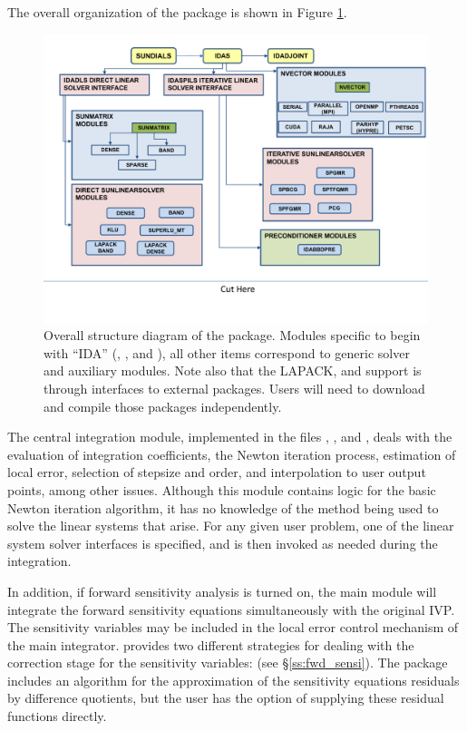 The overall organization of the {\idas} package is shown in Figure
\ref{f:idasorg}.
\begin{figure}
{\centerline{\includegraphics[width=\textwidth]{idasorg}}}
\caption [Overall structure diagram of the {\ida} package]
{Overall structure diagram of the {\ida} package.
  Modules specific to {\ida} begin with ``IDA'' ({\idadls},
  {\idaspils}, and {\idabbdpre}), all other items correspond
  to generic solver and auxiliary modules. 
  Note also that the LAPACK, {\klu} and {\superlumt} support is
  through interfaces to external packages. 
  Users will need to download and compile those packages independently.}
\label{f:idasorg}
\end{figure}
The central integration module, implemented in the files ,
, and , deals with the evaluation of integration 
coefficients, the Newton iteration process, estimation of local error,
selection of stepsize and order, and interpolation to user output
points, among other issues.  Although this module contains logic for
the basic Newton iteration algorithm, it has no knowledge of the
method being used to solve the linear systems that arise.  For any
given user problem, one of the linear system solver interfaces is specified, and
is then invoked as needed during the integration. 

In addition, if forward sensitivity analysis is turned on, the main module 
will integrate the forward sensitivity equations simultaneously with the original
IVP. The sensitivity variables may be included in the local error control
mechanism of the main integrator.
{\idas} provides two different strategies for dealing with the correction
stage for the sensitivity variables:  
(see \S\ref{ss:fwd_sensi}).
The {\idas} package includes an algorithm for the approximation of the
sensitivity equations residuals by difference quotients, but the user has
the option of supplying these residual functions directly.

